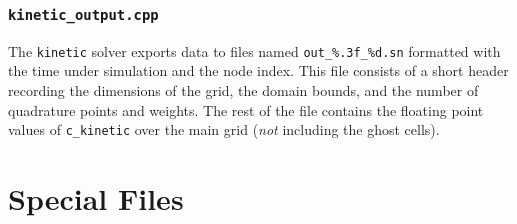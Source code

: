 \documentclass{article}
\newcommand{\kinetic}{\texttt{kinetic}\xspace}
\begin{document}
\subsubsection{\texttt{kinetic\_output.cpp}}
\label{src:kinetic_output.cpp}
The \kinetic solver exports data to files named \texttt{out\_\%.3f\_\%d.sn}
formatted with the time under simulation and the node index. This file
consists of a short header recording the dimensions of the grid, the domain bounds,
and the number of quadrature points and weights. The rest of the file contains the
floating point values of \texttt{c\_kinetic} over the main grid (\emph{not}
including the ghost cells).

\section{Special Files}
\label{file}
\end{document}
